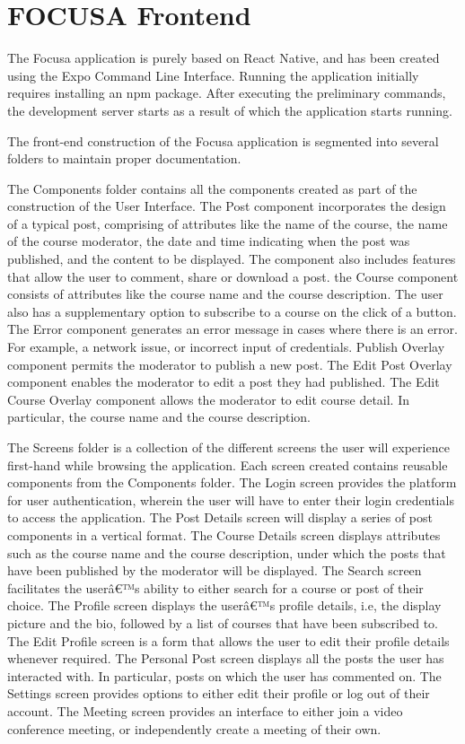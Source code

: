 \section{FOCUSA Frontend}
The Focusa application is purely based on React Native, and has been created using the Expo Command Line Interface. 
Running the application initially requires installing an npm package. After executing the preliminary commands, the development server starts as a result of which the application starts running.

The front-end construction of the Focusa application is segmented into several folders to maintain proper documentation.

The Components folder contains all the components created as part of the construction of the User Interface.
The Post component incorporates the design of a typical post, comprising of attributes like the name of the course, the name of the course moderator, the date and time indicating when the post was published, and the content to be displayed. The component also includes features that allow the user to comment, share or download a post.
the Course component consists of attributes like the course name and the course description. The user also has a supplementary option to subscribe to a course on the click of a button.
The Error component generates an error message in cases where there is an error. For example, a network issue, or incorrect input of credentials.
Publish Overlay component permits the moderator to publish a new post.
The Edit Post Overlay component enables the moderator to edit a post they had published.
The Edit Course Overlay component allows the moderator to edit course detail. In particular, the course name and the course description.

The Screens folder is a collection of the different screens the 
user will experience first-hand while browsing the application. 
Each screen created contains reusable components from the Components folder.
The Login screen provides the platform for user
authentication, wherein the user will have to enter their login
credentials to access the application. 
The Post Details screen will display a series of post components in a vertical format.
The Course Details screen displays attributes such as the course name and the course description, under which the posts that have been published by the moderator will be displayed. 
The Search screen facilitates the userâ€™s ability to either search for a course or post of their choice.
The Profile screen displays the userâ€™s profile details, i.e, the display picture and the bio, followed by a list of courses that have been subscribed to.
The Edit Profile screen is a form that allows the user to
edit their profile details whenever required.
The Personal Post screen displays all the posts the user has 
interacted with. In particular, posts on which the user has commented on.
The Settings screen provides options to either edit their profile or log out of their account.
The Meeting screen provides an interface to either join a video conference meeting, or independently create a meeting of their own.

